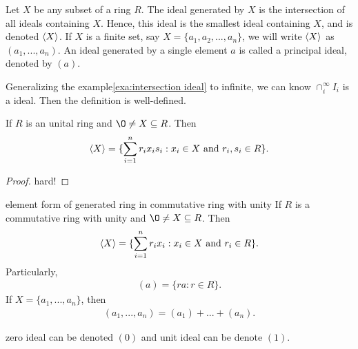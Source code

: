 \begin{definition}{}{}
    Let $X$ be any subset of a ring $R$. The ideal generated by $X$ is the intersection of all ideals containing $X$. 
    Hence, this ideal is the smallest ideal containing $X$, and is denoted $\langle X \rangle$. 
    If $X$ is a finite set, say $X=\{a_1,a_2,...,a_n\}$, we will write $\langle X \rangle$ as $(a_1,...,a_n)$. 
    An ideal generated by a single element $a$ is called a principal
ideal, denoted by $(a)$. 
\end{definition}
\begin{remark}
    Generalizing the example\ref{exa:intersection ideal} to infinite, we can know $\cap_{i}^{\infty} I_i$ is a ideal. 
    Then the definition is well-defined.
\end{remark}

\begin{proposition}{}{}
    If $R$ is an unital ring and $\O\neq X\subseteq R$. Then
    \begin{align*}
        \langle X \rangle =\{\sum\limits_{i=1}^{n}r_ix_is_i: x_i\in X \text{ and } r_i,s_i\in R\}.
    \end{align*}
\end{proposition}

\begin{proof}
    hard!
\end{proof}

\begin{proposition}{}{element form of generated ring in commutative ring with unity}
    If $R$ is a commutative ring with unity and $\O\neq X\subseteq R$. Then
    \begin{align*}
        \langle X \rangle =\{\sum\limits_{i=1}^{n}r_ix_i: x_i\in X \text{ and } r_i\in R\}.
    \end{align*}
    Particularly, 
    \begin{align*}
        (a) = \{ra:r\in R\}.
    \end{align*}
    If $X=\{a_1,...,a_n\}$, then
    \begin{align*}
        (a_1,...,a_n)=(a_1)+...+(a_n).
    \end{align*}
\end{proposition}
\begin{remark}
    zero ideal can be denoted $(0)$ and unit ideal can be denote $(1)$.
\end{remark}




